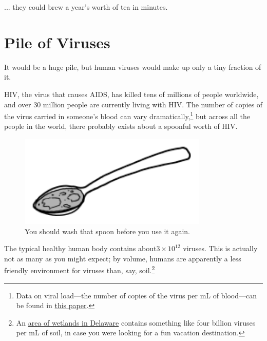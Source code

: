 {{... they could brew a year's worth of tea in minutes.}

{
\chapter{Pile of Viruses}
}

\hfill{}

{It would be a huge pile, but human viruses would make up only a tiny fraction of it.}

{HIV, the virus that causes AIDS, has killed tens of millions of people worldwide, and over 30 million people are currently living with HIV. The number of copies of the virus carried in someone's blood can vary dramatically,{\footnote{Data on viral load—the number of copies of the virus per mL of blood—can be found in \href{http://www.ncbi.nlm.nih.gov/pubmed/23196933}{this paper}.} } but across all the people in the world, there probably exists about a spoonful worth of HIV.}

\begin{figure}[!htbp]
\centering
\includegraphics[scale=0.5, max width=0.8\textwidth]{imgs/a/80/virus_spoon.png}
\caption{You should wash that spoon before you use it again.}
\end{figure}

{The typical healthy human body contains about\(3\times 10^{12}\) viruses. This is actually not as many as you might expect; by volume, humans are apparently a less friendly environment for viruses than, say, soil.{\footnote{An \href{http://www.rcn.montana.edu/pubs/pdf/2008/Srinivasiah\%20Res\%20\%20Micro\%202008.pdf}{area of wetlands in Delaware} contains something like four billion viruses per mL of soil, in case you were looking for a fun vacation destination.} } }

}
